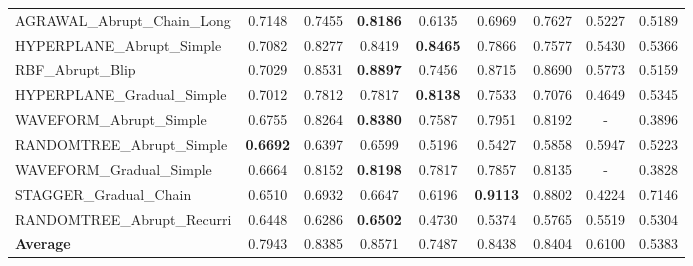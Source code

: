 \begin{table}[htbp]
\begin{tabular}{lcccccccc}
AGRAWAL_Abrupt_Chain_Long & 0.7148 & 0.7455 & \textbf{0.8186} & 0.6135 & 0.6969 & 0.7627 & 0.5227 & 0.5189 \\
HYPERPLANE_Abrupt_Simple & 0.7082 & 0.8277 & 0.8419 & \textbf{0.8465} & 0.7866 & 0.7577 & 0.5430 & 0.5366 \\
RBF_Abrupt_Blip & 0.7029 & 0.8531 & \textbf{0.8897} & 0.7456 & 0.8715 & 0.8690 & 0.5773 & 0.5159 \\
HYPERPLANE_Gradual_Simple & 0.7012 & 0.7812 & 0.7817 & \textbf{0.8138} & 0.7533 & 0.7076 & 0.4649 & 0.5345 \\
WAVEFORM_Abrupt_Simple & 0.6755 & 0.8264 & \textbf{0.8380} & 0.7587 & 0.7951 & 0.8192 & - & 0.3896 \\
RANDOMTREE_Abrupt_Simple & \textbf{0.6692} & 0.6397 & 0.6599 & 0.5196 & 0.5427 & 0.5858 & 0.5947 & 0.5223 \\
WAVEFORM_Gradual_Simple & 0.6664 & 0.8152 & \textbf{0.8198} & 0.7817 & 0.7857 & 0.8135 & - & 0.3828 \\
STAGGER_Gradual_Chain & 0.6510 & 0.6932 & 0.6647 & 0.6196 & \textbf{0.9113} & 0.8802 & 0.4224 & 0.7146 \\
RANDOMTREE_Abrupt_Recurri & 0.6448 & 0.6286 & \textbf{0.6502} & 0.4730 & 0.5374 & 0.5765 & 0.5519 & 0.5304 \\
\midrule
\textbf{Average} & 0.7943 & 0.8385 & 0.8571 & 0.7487 & 0.8438 & 0.8404 & 0.6100 & 0.5383 \\
\bottomrule
\end{tabular}
\end{table}